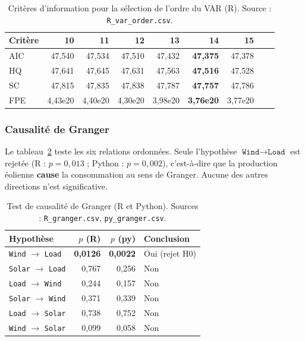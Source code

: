 \begin{table}[H]
\centering
\caption{Critères d'information pour la sélection de l'ordre du VAR (R).
Source : \texttt{R\_var\_order.csv}.}
\label{tab:var_order}
\small
\begin{tabular}{lrrrrrrrr}
\toprule
Critère & 10 & 11 & 12 & 13 & \textbf{14} & 15 \\
\midrule
AIC & 47{,}540 & 47{,}534 & 47{,}510 & 47{,}432 & \textbf{47{,}375} & 47{,}378 \\
HQ  & 47{,}641 & 47{,}645 & 47{,}631 & 47{,}563 & \textbf{47{,}516} & 47{,}528 \\
SC  & 47{,}815 & 47{,}835 & 47{,}838 & 47{,}787 & \textbf{47{,}757} & 47{,}786 \\
FPE & 4{,}43e20 & 4{,}40e20 & 4{,}30e20 & 3{,}98e20 & \textbf{3{,}76e20} & 3{,}77e20 \\
\bottomrule
\end{tabular}
\end{table}

\subsubsection{Causalité de Granger}
Le tableau~\ref{tab:granger} teste les six relations ordonnées. Seule
l'hypothèse \(\texttt{Wind} \to \texttt{Load}\) est rejetée (R : \(p=0{,}013\)
; Python : \(p=0{,}002\)), c'est-à-dire que la production éolienne
\textbf{cause} la consommation au sens de Granger. Aucune des autres
directions n'est significative.

\begin{table}[H]
\centering
\caption{Test de causalité de Granger (R et Python).
Sources : \texttt{R\_granger.csv}, \texttt{py\_granger.csv}.}
\label{tab:granger}
\small
\begin{tabular}{lrrl}
\toprule
Hypothèse & $p$ (R) & $p$ (py) & Conclusion \\
\midrule
\texttt{Wind} $\to$ \texttt{Load}  & \textbf{0{,}0126} & \textbf{0{,}0022} & Oui (rejet H0) \\
\texttt{Solar} $\to$ \texttt{Load} & 0{,}767 & 0{,}256 & Non \\
\texttt{Load} $\to$ \texttt{Wind}  & 0{,}244 & 0{,}157 & Non \\
\texttt{Solar} $\to$ \texttt{Wind} & 0{,}371 & 0{,}339 & Non \\
\texttt{Load} $\to$ \texttt{Solar}& 0{,}738 & 0{,}752 & Non \\
\texttt{Wind} $\to$ \texttt{Solar}& 0{,}099 & 0{,}058 & Non \\
\bottomrule
\end{tabular}
\end{table}

